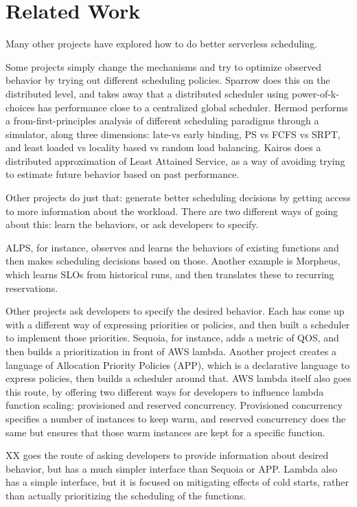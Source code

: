 \section{Related Work}

Many other projects have explored how to do better serverless scheduling.
 
Some projects simply change the mechanisms and try to optimize observed behavior
by trying out different scheduling policies. Sparrow does this on the
distributed level, and takes away that a distributed scheduler using
power-of-k-choices has performance close to a centralized global scheduler.
Hermod performs a from-first-principles analysis of different scheduling
paradigms through a simulator, along three dimensions: late-vs early binding, PS
vs FCFS vs SRPT, and least loaded vs locality based vs random load balancing.
Kairos does a distributed approximation of Least Attained Service, as a way of
avoiding trying to estimate future behavior based on past performance. 

Other projects do just that: generate better scheduling decisions by getting
access to more information about the workload. There are two different ways of
going about this: learn the behaviors, or ask developers to specify. 

ALPS, for instance, observes and learns the behaviors of existing functions and
then makes scheduling decisions based on those. Another example is Morpheus,
which learns SLOs from historical runs, and then translates these to recurring
reservations. 

Other projects ask developers to specify the desired behavior. Each has come up
with a different way of expressing priorities or policies, and then built a
scheduler to implement those priorities. Sequoia, for instance, adds a metric of
QOS, and then builds a prioritization in front of AWS lambda. Another project
creates a language of Allocation Priority Policies (APP), which is a declarative
language to express policies, then builds a scheduler around that. AWS lambda itself also
goes this route, by offering two different ways for developers to influence
lambda function scaling: provisioned and reserved concurrency. Provisioned
concurrency specifies a number of instances to keep warm, and reserved
concurrency does the same but ensures that those warm instances are kept for a
specific function. 

XX goes the route of asking developers to provide information about desired
behavior, but has a much simpler interface than Sequoia or APP. Lambda also has
a simple interface, but it is focused on mitigating effects of cold starts,
rather than actually prioritizing the scheduling of the functions.

